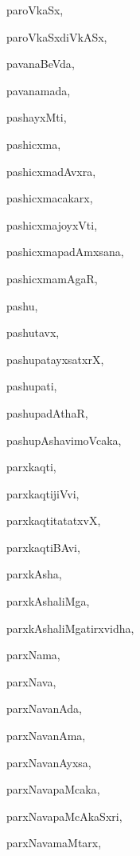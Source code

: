 \begin{multicols}{2}
{paroVkaSx}, \pageref{paroVkaSx}

{paroVkaSxdiVkASx}, \pageref{paroVkaSxdiVkASx}

{pavanaBeVda}, \pageref{pavanaBeVda}

{pavanamada}, \pageref{pavanamada}

{pashayxMti}, \pageref{pashayxMti}

{pashicxma}, \pageref{pashicxma}

{pashicxmadAvxra}, \pageref{pashicxmadAvxra}

{pashicxmacakarx}, \pageref{pashicxmacakarx}

{pashicxmajoyxVti}, \pageref{pashicxmajoyxVti}

{pashicxmapadAmxsana}, \pageref{pashicxmapadAmxsana}

{pashicxmamAgaR}, \pageref{pashicxmamAgaR}

{pashu}, \pageref{pashu}

{pashutavx}, \pageref{pashutavx}

{pashupatayxsatxrX}, \pageref{pashupatayxsatxrX}

{pashupati}, \pageref{pashupati}

{pashupadAthaR}, \pageref{pashupadAthaR}

{pashupAshavimoVcaka}, \pageref{pashupAshavimoVcaka}

{parxkaqti}, \pageref{parxkaqti}

{parxkaqtijiVvi}, \pageref{parxkaqtijiVvi}

{parxkaqtitatatxvX}, \pageref{parxkaqtitatatxvX}

{parxkaqtiBAvi}, \pageref{parxkaqtiBAvi}

{parxkAsha}, \pageref{parxkAsha}

{parxkAshaliMga}, \pageref{parxkAshaliMga}

{parxkAshaliMgatirxvidha}, \pageref{parxkAshaliMgatirxvidha}

{parxNama}, \pageref{parxNama}

{parxNava}, \pageref{parxNava}

{parxNavanAda}, \pageref{parxNavanAda}

{parxNavanAma}, \pageref{parxNavanAma}

{parxNavanAyxsa}, \pageref{parxNavanAyxsa}

{parxNavapaMcaka}, \pageref{parxNavapaMcaka}

{parxNavapaMcAkaSxri}, \pageref{parxNavapaMcAkaSxri}

{parxNavamaMtarx}, \pageref{parxNavamaMtarx}


\end{multicols}
